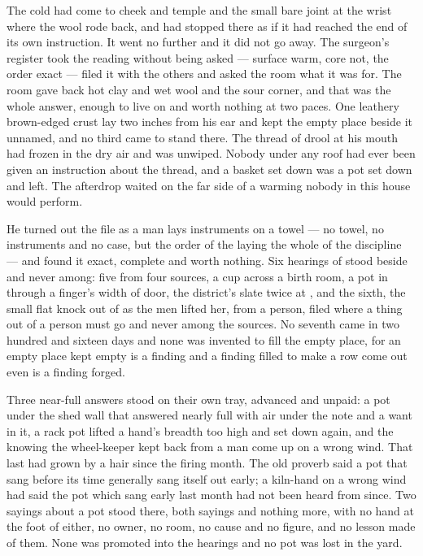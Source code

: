 The cold had come to cheek and temple and the small bare joint at the wrist where the wool rode back, and had stopped there as if it had reached the end of its own instruction. It went no further and it did not go away. The surgeon's register took the reading without being asked --- surface warm, core not, the order exact --- filed it with the others and asked the room what it was for. The room gave back hot clay and wet wool and the sour corner, and that was the whole answer, enough to live on and worth nothing at two paces. One leathery brown-edged crust lay two inches from his ear and kept the empty place beside it unnamed, and no third came to stand there. The thread of drool at his mouth had frozen in the dry air and was unwiped. Nobody under any roof had ever been given an instruction about the thread, and a basket set down was a pot set down and left. The afterdrop waited on the far side of a warming nobody in this house would perform.

\scenebreak

He turned out the file as a man lays instruments on a towel --- no towel, no instruments and no case, but the order of the laying the whole of the discipline --- and found it exact, complete and worth nothing. Six hearings of  stood beside and never among: five from four sources, a cup across a birth room, a pot in  through a finger's width of door, the district's slate twice at , and the sixth, the small flat knock out of  as the men lifted her, from a person, filed where a thing out of a person must go and never among the sources. No seventh came in two hundred and sixteen days and none was invented to fill the empty place, for an empty place kept empty is a finding and a finding filled to make a row come out even is a finding forged.

Three near-full answers stood on their own tray, advanced and unpaid: a pot under the shed wall that answered nearly full with air under the note and a want in it, a rack pot lifted a hand's breadth too high and set down again, and the knowing the wheel-keeper kept back from a man come up on a wrong wind. That last had grown by a hair since the firing month. The old proverb said a pot that sang before its time generally sang itself out early; a kiln-hand on a wrong wind had said the pot which sang early last month had not been heard from since. Two sayings about a pot stood there, both sayings and nothing more, with no hand at the foot of either, no owner, no room, no cause and no figure, and no lesson made of them. None was promoted into the hearings and no pot was lost in the yard.

